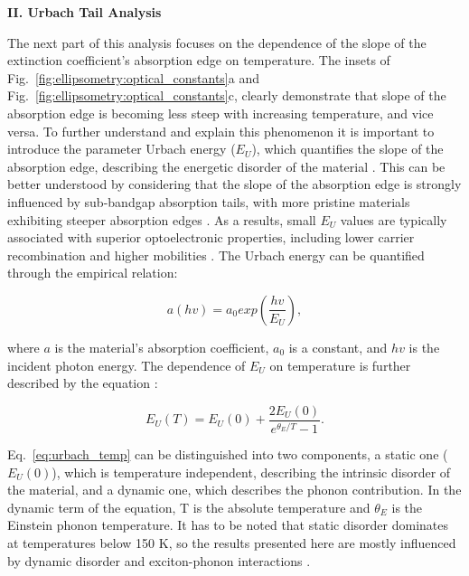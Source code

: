 \textbf{II. Urbach Tail Analysis}

The next part of this analysis focuses on the dependence of the slope of the extinction coefficient's absorption edge on temperature. The insets of Fig.~\ref{fig:ellipsometry:optical_constants}a and Fig.~\ref{fig:ellipsometry:optical_constants}c, clearly demonstrate that slope of the absorption edge is becoming less steep with increasing temperature, and vice versa. To further understand and explain this phenomenon it is important to introduce the parameter Urbach energy ($E_U$), which quantifies the slope of the absorption edge, describing the energetic disorder of the material \cite{Urbach1953TheSolids,Rajagopal2017DefectPhotovoltaics}. This can be better understood by considering that the slope of the absorption edge is strongly influenced by sub-bandgap absorption tails, with more pristine materials exhibiting steeper absorption edges \cite{Zhang2022UnravelingDisorder}. As a results, small $E_U$ values are typically associated with superior optoelectronic properties, including lower carrier recombination and higher mobilities \cite{Zhang2022UnravelingDisorder, Ledinsky2019TemperaturePerovskites}. The Urbach energy can be quantified through the empirical relation: 

\begin{equation}
    a(hv) = a_0exp(\frac{hv}{E_U}),
    \label{eq:urbach_absorption}
\end{equation}

where $a$ is the material's absorption coefficient, $a_0$ is a constant, and $hv$ is the incident photon energy. The dependence of $E_U$ on temperature is further described by the equation \cite{Kurik1971UrbachRule}: 

\begin{equation}
    E_U(T) = E_U(0) + \frac{2E_U(0)}{e^{\theta_E /T}-1}.
    \label{eq:urbach_temp}
\end{equation}

Eq.~\ref{eq:urbach_temp} can be distinguished into two components, a static one ($E_U(0)$), which is temperature independent, describing the intrinsic disorder of the material, and a dynamic one, which describes the phonon contribution. In the dynamic term of the equation, T is the absolute temperature and $\theta_E$ is the Einstein phonon temperature. It has to be noted that static disorder dominates at temperatures below 150 K, so the results presented here are mostly influenced by dynamic disorder and exciton-phonon interactions \cite{Zhang2022UnravelingDisorder}.


